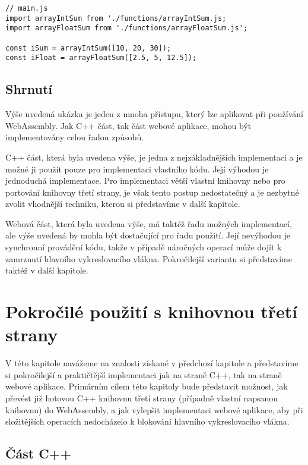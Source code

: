 \documentclass{{template/ctuthesis}}
\begin{document}
\begin{verbatim}
// main.js
import arrayIntSum from './functions/arrayIntSum.js;
import arrayFloatSum from './functions/arrayFloatSum.js';

const iSum = arrayIntSum([10, 20, 30]);
const iFloat = arrayFloatSum([2.5, 5, 12.5]);
\end{verbatim}

\subsection{Shrnutí}

Výše uvedená ukázka je jeden z mnoha přístupu, který lze aplikovat při používání WebAssembly. Jak C++ část, tak část webové aplikace, mohou být implementovány celou řadou způsobů.

C++ část, která byla uvedena výše, je jedna z nejzákladnějších implementací a je možné ji použít pouze pro implementaci vlastního kódu. Její výhodou je jednoduchá implementace. Pro implementaci větší vlastní knihovny nebo pro portování knihovny třetí strany, je však tento postup nedostatečný a je nezbytné zvolit vhodnější techniku, kterou si představíme v další kapitole.

Webová část, která byla uvedena výše, má taktéž řadu možných implementací, ale výše uvedená by mohla být dostačující pro řadu použití. Její nevýhodou je synchronní provádění kódu, takže v případě náročných operací může dojít k zamrznutí hlavního vykreslovacího vlákna. Pokročilejší variantu si představíme taktéž v další kapitole.


\section{Pokročilé použití s knihovnou třetí strany}

V této kapitole navážeme na znalosti získané v předchozí kapitole a představíme si pokročilejší a praktičtější implementaci jak na straně C++, tak na straně webové aplikace. Primárním cílem této kapitoly bude představit možnost, jak převést již hotovou C++ knihovnu třetí strany (případně vlastní napsanou knihovnu) do WebAssembly, a jak vylepšit implementaci webové aplikace, aby při složitějších operacích nedocházelo k blokování hlavního vykreslovacího vlákna.

\subsection{Část C++}
\end{document}
